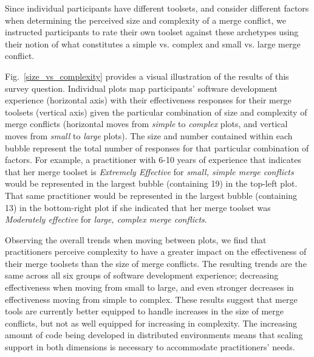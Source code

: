 Since individual participants have different toolsets, and consider different factors when determining the perceived size and complexity of a merge conflict, we instructed participants to rate their own toolset against these archetypes using their notion of what constitutes a simple vs. complex and small vs. large merge conflict.

Fig.~\ref{size_vs_complexity} provides a visual illustration of the results of this survey question.
Individual plots map participants' software development experience (horizontal axis) with their effectiveness responses for their merge toolsets (vertical axis) given the particular combination of size and complexity of merge conflicts (horizontal moves from \textit{simple} to \textit{complex} plots, and vertical moves from \textit{small} to \textit{large} plots).
The size and number contained within each bubble represent the total number of responses for that particular combination of factors.
For example, a practitioner with 6-10 years of experience that indicates that her merge toolset is \textit{Extremely Effective} for \textit{small, simple merge conflicts} would be represented in the largest bubble (containing 19) in the top-left plot.
That same practitioner would be represented in the largest bubble (containing 13) in the bottom-right plot if she indicated that her merge toolset was \textit{Moderately effective} for \textit{large, complex merge conflicts}.

Observing the overall trends when moving between plots, we find that practitioners perceive complexity to have a greater impact on the effectiveness of their merge toolsets than the size of merge conflicts.
The resulting trends are the same across all six groups of software development experience; decreasing effectiveness when moving from small to large, and even stronger decreases in effectiveness moving from simple to complex.
These results suggest that merge tools are currently better equipped to handle increases in the size of merge conflicts, but not as well equipped for increasing in complexity.
The increasing amount of code being developed in distributed environments means that scaling support in both dimensions is necessary to accommodate practitioners' needs.